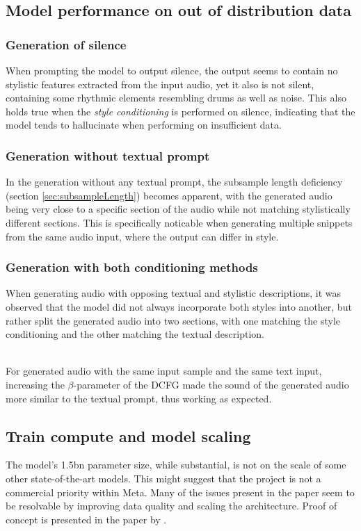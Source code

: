 \documentclass[a4paper,12pt,twoside]{article}
\begin{document}
\subsection{Model performance on out of distribution data}
\subsubsection{Generation of silence}
When prompting the model to output silence, the output seems to contain no stylistic features extracted from the input audio, yet it also is not silent, containing some rhythmic elements resembling drums as well as noise. This also holds true when the \textit{style conditioning} is performed on silence, indicating that the model tends to hallucinate when performing on insufficient data.

\subsubsection{Generation without textual prompt}
In the generation without any textual prompt, the subsample length deficiency (section \ref{sec:subsampleLength}) becomes apparent, with the generated audio being very close to a specific section of the audio while not matching stylistically different sections. This is specifically noticable when generating multiple snippets from the same audio input, where the output can differ in style.

\subsubsection{Generation with both conditioning methods}
When generating audio with opposing textual and stylistic descriptions, it was observed that the model did not always incorporate both styles into another, but rather split the generated audio into two sections, with one matching the style conditioning and the other matching the textual description. \\ \

For generated audio with the same input sample and the same text input, increasing the $\beta$-parameter of the DCFG made the sound of the generated audio more similar to the textual prompt, thus working as expected.

\subsection{Train compute and model scaling}
The model's 1.5bn parameter size, while substantial, is not on the scale of some other state-of-the-art models. This might suggest that the project is not a commercial priority within Meta. Many of the issues present in the paper seem to be resolvable by improving data quality and scaling the architecture. Proof of concept is presented in the paper by \cite{kaplanScalingLawsNeural2020}.
\end{document}
